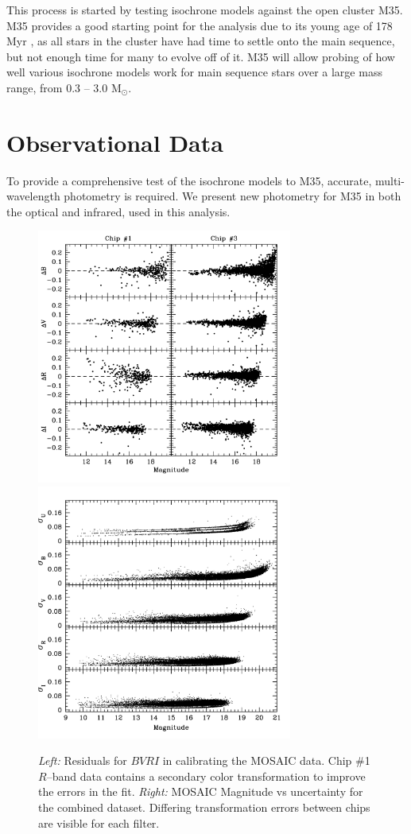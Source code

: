 \documentclass[iop]{emulateapj}
\begin{document}
This process is started by testing isochrone models against the open cluster M35. M35 provides a good starting point for the analysis due to its young age of 178 Myr \citep{2002AA...389..871D}, as all stars in the cluster have had time to settle onto the main sequence, but not enough time for many to evolve off of it. M35 will allow probing of how well various isochrone models work for main sequence stars over a large mass range, from 0.3 -- 3.0 M$_\odot$.




\section{Observational Data} \label{sec:data}
To provide a comprehensive test of the isochrone models to M35, accurate, multi-wavelength photometry is required. We present new photometry for M35 in both the optical and infrared, used in this analysis.

\begin{figure} \centering
\includegraphics[trim = 0mm 20mm 20mm 0mm, clip, width=3.3in]{fig1_a.png}			%
\includegraphics[trim = 0mm 20mm 20mm 40mm, clip, width=3.3in]{fig1_b.png}		%
\caption{\emph{Left:} Residuals for $BVRI$ in calibrating the MOSAIC data. Chip \#1 $R$--band data contains a secondary color transformation to improve the errors in the fit. \emph{Right:} MOSAIC Magnitude vs uncertainty for the combined dataset. Differing transformation errors between chips are visible for each filter. \label{fig:MOSphotometry}}
\end{figure}
\end{document}
